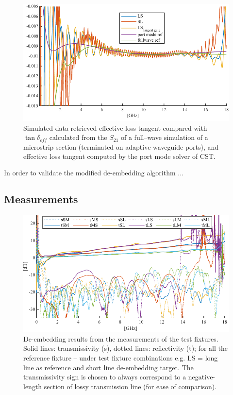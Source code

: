 \documentclass[11pt,a4paper]{article}
\begin{document}
    \begin{figure}[!tb]
        \includegraphics[width=\textwidth]{tandsim}
        \caption{Simulated data retrieved effective loss tangent compared with $\tan\delta_{eff}$ calculated from
        the $S_{21}$ of a full--wave simulation of a microstrip section (terminated on adaptive waveguide ports),
            and effective loss tangent computed by the port mode solver of CST.}
        \label{fig:tandsim}
    \end{figure}
    In order to validate the modified de-embedding algorithm ...
    \subsection{Measurements}
    \label{subsec:measurements}
    \begin{figure}[!tb]
        \includegraphics[width=\textwidth]{sparameas}
        \caption{De-embedding results from the measurements of the test fixtures.
        Solid lines: transmissivity (s), dotted lines: reflectivity (t);
        for all the reference fixture -- under test fixture combinations e.g. LS = long line as reference and short line de-embedding target.
        The transmissivity sign is chosen to always correspond to a negative-length section
        of lossy transmission line (for ease of comparison).}
        \label{fig:sparameas}
    \end{figure}
\end{document}
